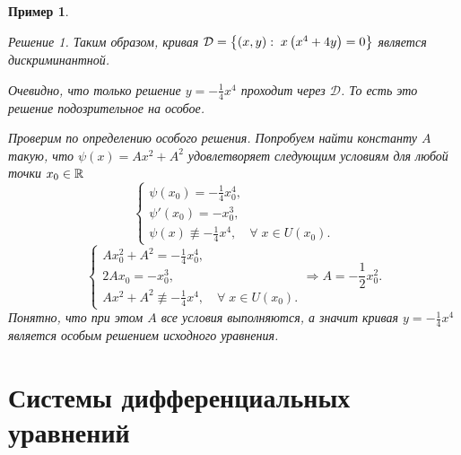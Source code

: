 \documentclass[a5paper, 11pt]{article}
\theoremstyle{definition}
\theoremstyle{plain}
\newtheorem{Ex}{Пример}
\theoremstyle{remark}
\newtheorem*{Solution}{Решение}
\begin{document}
\begin{Ex}
\begin{Solution}
		Таким образом, кривая $\mathcal{D} =\left\{(x,y) :\; x\left(x^4+4y\right) = 0\right\}$ является дискриминантной.
		
		Очевидно, что только решение $y=-\frac14 x^4$ проходит через $\mathcal{D}$. То есть это решение подозрительное на особое.
		
		Проверим по определению особого решения. Попробуем найти константу $A$ такую, что $\psi (x) = Ax^2+A^2$ удовлетворяет следующим условиям для любой точки $x_0 \in \mathbb{R}$
		\[
		\begin{cases}
			\psi(x_0) = -\frac14 x_0^4,\\
			\psi'(x_0) = -x_0^3,\\
			\psi(x) \not \equiv -\frac14 x^4, \quad \forall \; x \in U(x_0).
		\end{cases}
		\]
		\[
		\begin{cases}
			Ax_0^2+A^2 = -\frac14 x_0^4,\\
			2Ax_0 = -x_0^3,\\
			Ax^2+A^2 \not \equiv -\frac14 x^4 , \quad \forall \; x \in U(x_0).
		\end{cases}
		\Rightarrow
			A = -\frac12 x_0^2.
		\]
		Понятно, что при этом $A$ все условия выполняются, а значит кривая $y=-\frac14 x^4$ является особым решением исходного уравнения.
		
		\begin{figure}[h!]
			\centering
		\end{figure}
		\end{Solution}
	\end{Ex}
	\section[11.11.2022]{Системы дифференциальных уравнений}
\end{document}
